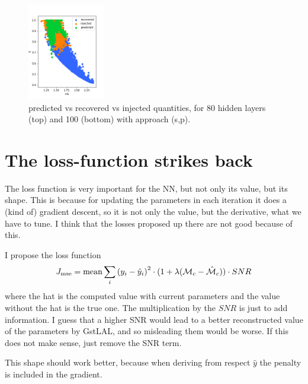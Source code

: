 \documentclass[prd,aps,twocolumn,a4paper,showkeys,nofootinbib]{article}
\begin{document}
\begin{figure}[]
  \includegraphics[width=0.3\textwidth]{./Figs/100_q}
  \caption{\label{fig:approach3_comparison3} predicted vs recovered vs injected quantities, for 80 hidden layers (top) and 100 (bottom) with approach (s,p).}
\end{figure}

\section{The loss-function strikes back}
\label{sec:loss_new}
The loss function is very important for the NN, but not only its value, but its shape. This is because for updating the parameters in each iteration it does a (kind of) gradient descent, so it is not only the value, but the derivative, what we have to tune. I think that the losses proposed up there are not good because of this.

I propose the loss function 
\begin{equation}
J_{\rm mse} = {\rm mean} \sum_i \left( y_i - \hat{y}_i \right)^2 \cdot(1+\lambda(\mathcal{M}_c-\hat{\mathcal{M}}_c))\cdot SNR
\end{equation}
where the hat is the computed value with current parameters and the value without the hat is the true one. The multiplication by the $SNR$ is just to add information. I guess that a higher SNR would lead to a better reconstructed value of the parameters by GstLAL, and so misleading them would be worse. If this does not make sense, just remove the SNR term.

This shape should work better, because when deriving from respect $\hat{y}$ the penalty is included in the gradient.

\end{document}
